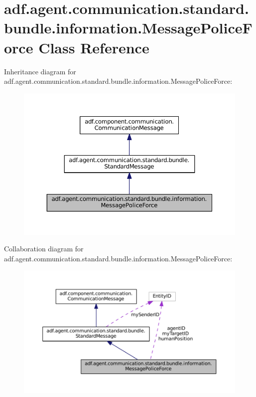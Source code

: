 \hypertarget{classadf_1_1agent_1_1communication_1_1standard_1_1bundle_1_1information_1_1MessagePoliceForce}{}\section{adf.\+agent.\+communication.\+standard.\+bundle.\+information.\+Message\+Police\+Force Class Reference}
\label{classadf_1_1agent_1_1communication_1_1standard_1_1bundle_1_1information_1_1MessagePoliceForce}


Inheritance diagram for adf.\+agent.\+communication.\+standard.\+bundle.\+information.\+Message\+Police\+Force\+:
\nopagebreak
\begin{figure}[H]
\begin{center}
\leavevmode
\includegraphics[width=350pt]{classadf_1_1agent_1_1communication_1_1standard_1_1bundle_1_1information_1_1MessagePoliceForce__inherit__graph}
\end{center}
\end{figure}


Collaboration diagram for adf.\+agent.\+communication.\+standard.\+bundle.\+information.\+Message\+Police\+Force\+:
\nopagebreak
\begin{figure}[H]
\begin{center}
\leavevmode
\includegraphics[width=350pt]{classadf_1_1agent_1_1communication_1_1standard_1_1bundle_1_1information_1_1MessagePoliceForce__coll__graph}
\end{center}
\end{figure}
